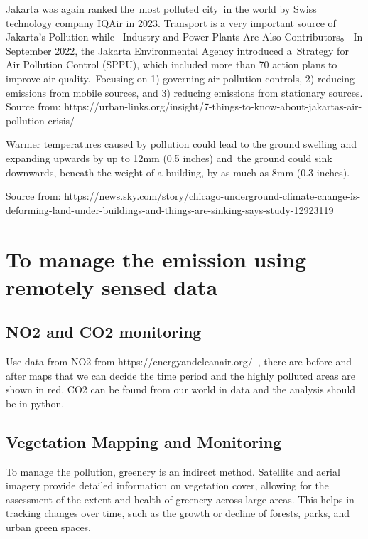 \documentclass[
  letterpaper,
  DIV=11,
  numbers=noendperiod]{scrreprt}
\begin{document}
Jakarta was again ranked the~most polluted city~in the world by Swiss
technology company IQAir in 2023. Transport is a very important source
of Jakarta's Pollution while ~Industry and Power Plants Are Also
Contributors。 In September 2022, the Jakarta Environmental Agency
introduced a~Strategy for Air Pollution Control (SPPU), which included
more than 70 action plans to improve air quality.~Focusing on 1)
governing air pollution controls, 2) reducing emissions from mobile
sources, and 3) reducing emissions from stationary sources. Source from:
https://urban-links.org/insight/7-things-to-know-about-jakartas-air-pollution-crisis/

Warmer temperatures caused by pollution could lead to the ground
swelling and expanding upwards by up to 12mm (0.5 inches) and~the ground
could sink downwards, beneath the weight of a building, by as much as
8mm (0.3 inches).

Source from:
https://news.sky.com/story/chicago-underground-climate-change-is-deforming-land-under-buildings-and-things-are-sinking-says-study-12923119


\chapter{To manage the emission using remotely sensed
data}\label{to-manage-the-emission-using-remotely-sensed-data}

\section{NO2 and CO2 monitoring}\label{no2-and-co2-monitoring}

Use data from NO2 from https://energyandcleanair.org/~, there are before
and after maps that we can decide the time period and the highly
polluted areas are shown in red. CO2 can be found from our world in data
and the analysis should be in python.

\section{Vegetation Mapping and
Monitoring}\label{vegetation-mapping-and-monitoring}

To manage the pollution, greenery is an indirect method. Satellite and
aerial imagery provide detailed information on vegetation cover,
allowing for the assessment of the extent and health of greenery across
large areas. This helps in tracking changes over time, such as the
growth or decline of forests, parks, and urban green spaces.
\end{document}

